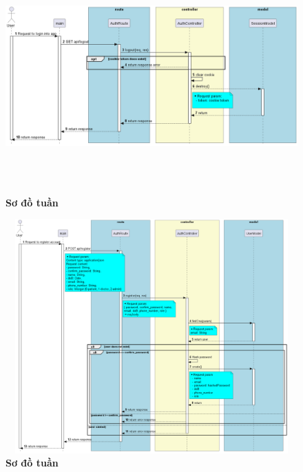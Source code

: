 \begin{figure}[H]
  \centering
  \includegraphics[width=16cm,height=9cm]{Images/server/sequence/server/logout.png}
  \caption[Sơ đồ tuần tự ]{\bfseries \fontsize{12pt}{0pt}
  \selectfont Sơ đồ tuần }
  \label{hinh21} %
\end{figure}


\begin{figure}[H]
  \centering
  \includegraphics[width=16cm,height=9cm]{Images/server/sequence/server/register.png}
  \caption[Sơ đồ tuần tự ]{\bfseries \fontsize{12pt}{0pt}
  \selectfont Sơ đồ tuần }
  \label{hinh21} %
\end{figure}


